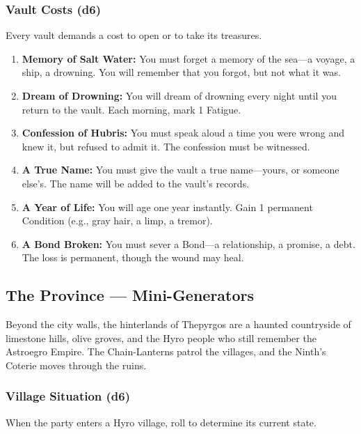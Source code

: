 \subsubsection*{Vault Costs (d6)}
Every vault demands a cost to open or to take its treasures.

\begin{enumerate}
\item \textbf{Memory of Salt Water:} You must forget a memory of the sea---a voyage, a ship, a drowning. You will remember that you forgot, but not what it was.
\item \textbf{Dream of Drowning:} You will dream of drowning every night until you return to the vault. Each morning, mark 1 Fatigue.
\item \textbf{Confession of Hubris:} You must speak aloud a time you were wrong and knew it, but refused to admit it. The confession must be witnessed.
\item \textbf{A True Name:} You must give the vault a true name---yours, or someone else's. The name will be added to the vault's records.
\item \textbf{A Year of Life:} You will age one year instantly. Gain 1 permanent Condition (e.g., gray hair, a limp, a tremor).
\item \textbf{A Bond Broken:} You must sever a Bond---a relationship, a promise, a debt. The loss is permanent, though the wound may heal.
\end{enumerate}

\subsection*{The Province --- Mini-Generators}
\label{sec:thepyrgos-province}

Beyond the city walls, the hinterlands of Thepyrgos are a haunted countryside of limestone hills, olive groves, and the Hyro people who still remember the Astroegro Empire. The Chain-Lanterns patrol the villages, and the Ninth's Coterie moves through the ruins.

\subsubsection*{Village Situation (d6)}
When the party enters a Hyro village, roll to determine its current state.

